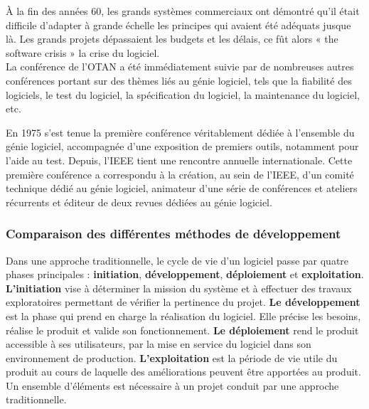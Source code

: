 À la fin des années 60, les grands systèmes commerciaux ont démontré qu'il était difficile d'adapter à grande échelle les principes qui avaient été adéquats jusque là. Les grands projets dépassaient les budgets et les délais, ce fût alors « the software crisis » la crise du logiciel\cite{origine_gl2}.\\

La conférence de l'OTAN a été immédiatement suivie par de nombreuses autres conférences portant sur des thèmes liés au génie logiciel, tels que la fiabilité des logiciels, le test du logiciel, la spécification du logiciel, la maintenance du logiciel, etc.

En 1975 s'est tenue la première conférence véritablement dédiée à l’ensemble du génie logiciel, accompagnée d'une exposition de premiers outils, notamment pour l’aide au test. Depuis, l’IEEE tient une rencontre annuelle internationale. Cette première conférence a correspondu à la création, au sein de l’IEEE, d’un comité technique dédié au génie logiciel, animateur d’une série de conférences et ateliers récurrents et éditeur de deux revues dédiées au génie logiciel\cite{origine_gl3}.
\subsubsection{Comparaison des différentes méthodes de développement}
Dans une approche traditionnelle, le cycle de vie d'un logiciel passe par quatre phases principales : \textbf{initiation}, \textbf{développement}, \textbf{déploiement} et \textbf{exploitation}.\\
\textbf{L'initiation} vise à déterminer la mission du système et à effectuer des travaux exploratoires permettant de vérifier la pertinence du projet. \textbf{Le développement} est la phase qui prend en charge la réalisation du logiciel. Elle précise les besoins, réalise le produit et valide son fonctionnement. \textbf{Le déploiement} rend le produit accessible à ses utilisateurs, par la mise en service du logiciel dans son environnement de production. \textbf{L’exploitation} est la période de vie utile du produit au cours de laquelle des améliorations peuvent être apportées au produit. 
Un ensemble d’éléments est nécessaire à un projet conduit par une approche traditionnelle. 

